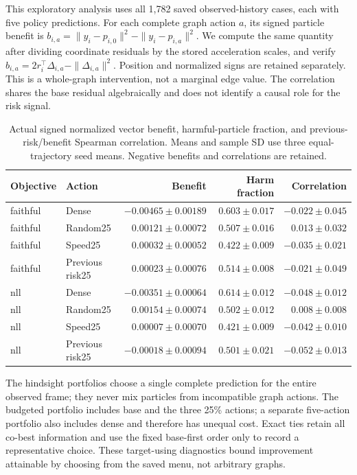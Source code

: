 This exploratory analysis uses all 1,782 saved observed-history cases, each with five policy predictions.
For each complete graph action $a$, its signed particle benefit is
$b_{i,a}=\|y_i-p_{i,0}\|^2-\|y_i-p_{i,a}\|^2$.
We compute the same quantity after dividing coordinate residuals by the stored
acceleration scales, and verify $b_{i,a}=2r_i^\top\Delta_{i,a}-\|\Delta_{i,a}\|^2$.
Position and normalized signs are retained separately. This is a whole-graph
intervention, not a marginal edge value. The correlation shares the base residual
algebraically and does not identify a causal role for the risk signal.

\begin{table}[t]
\centering\small
\caption{Actual signed normalized vector benefit, harmful-particle fraction,
and previous-risk/benefit Spearman correlation. Means and sample SD use three
equal-trajectory seed means. Negative benefits and correlations are retained.}
\label{tab:actual-action-benefit}
\begin{tabular}{llrrr}
\toprule
Objective & Action & Benefit & Harm fraction & Correlation\\
\midrule
faithful & Dense & $-0.00465\pm0.00189$ & $0.603\pm0.017$ & $-0.022\pm0.045$\\
faithful & Random25 & $0.00121\pm0.00072$ & $0.507\pm0.016$ & $0.013\pm0.032$\\
faithful & Speed25 & $0.00032\pm0.00052$ & $0.422\pm0.009$ & $-0.035\pm0.021$\\
faithful & Previous risk25 & $0.00023\pm0.00076$ & $0.514\pm0.008$ & $-0.021\pm0.049$\\
nll & Dense & $-0.00351\pm0.00064$ & $0.614\pm0.012$ & $-0.048\pm0.012$\\
nll & Random25 & $0.00154\pm0.00074$ & $0.502\pm0.012$ & $0.008\pm0.008$\\
nll & Speed25 & $0.00007\pm0.00070$ & $0.421\pm0.009$ & $-0.042\pm0.010$\\
nll & Previous risk25 & $-0.00018\pm0.00094$ & $0.501\pm0.021$ & $-0.052\pm0.013$\\
\bottomrule
\end{tabular}
\end{table}

The hindsight portfolios choose a single complete prediction for the entire
observed frame; they never mix particles from incompatible graph actions.
The budgeted portfolio includes base and the three 25\% actions; a separate
five-action portfolio also includes dense and therefore has unequal cost.
Exact ties retain all co-best information and use the fixed base-first order
only to record a representative choice. These target-using diagnostics bound
improvement attainable by choosing from the saved menu, not arbitrary graphs.

